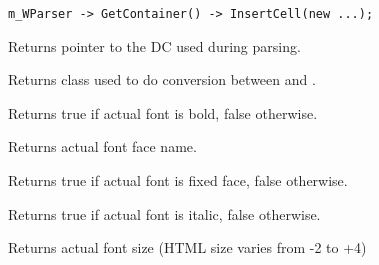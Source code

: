 \begin{verbatim}
m_WParser -> GetContainer() -> InsertCell(new ...);
\end{verbatim}

\label{wxhtmlwinparsergetdc}


Returns pointer to the DC used during parsing.

\label{wxhtmlwinparsergetencodingconverter}


Returns  class used
to do conversion between  
and .

\label{wxhtmlwinparsergetfontbold}


Returns true if actual font is bold, false otherwise.

\label{wxhtmlwinparsergetfontface}


Returns actual font face name.

\label{wxhtmlwinparsergetfontfixed}


Returns true if actual font is fixed face, false otherwise.

\label{wxhtmlwinparsergetfontitalic}


Returns true if actual font is italic, false otherwise.

\label{wxhtmlwinparsergetfontsize}


Returns actual font size (HTML size varies from -2 to +4)

\label{wxhtmlwinparsergetfontunderlined}


